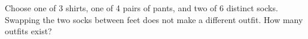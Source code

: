 Choose one of 3 shirts, one of 4 pairs of pants, and two of 6 distinct socks. Swapping the two socks between feet does not make a different outfit. How many outfits exist?
